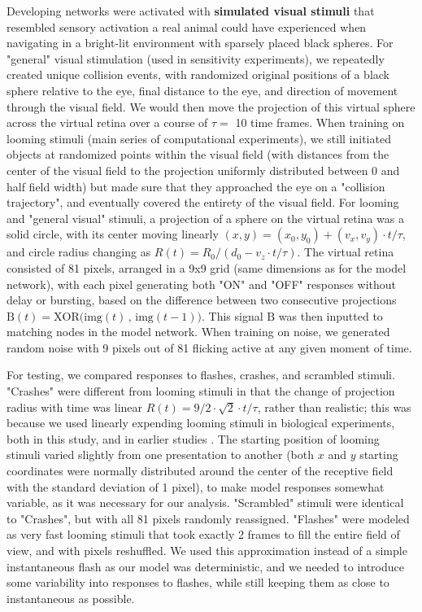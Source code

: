 \documentclass{article}
\begin{document}
Developing networks were activated with \textbf{simulated visual stimuli} that resembled sensory activation a real animal could have experienced when navigating in a bright-lit environment with sparsely placed black spheres. For "general" visual stimulation (used in sensitivity experiments), we repeatedly created unique collision events, with randomized original positions of a black sphere relative to the eye, final distance to the eye, and direction of movement through the visual field. We would then move the projection of this virtual sphere across the virtual retina over a course of $\tau=$ 10 time frames.  When training on looming stimuli (main series of computational experiments), we still initiated objects at randomized points within the visual field (with distances from the center of the visual field to the projection uniformly distributed between 0 and half field width) but made sure that they approached the eye on a "collision trajectory", and eventually covered the entirety of the visual field. For looming and "general visual" stimuli, a projection of a sphere on the virtual retina was a solid circle, with its center moving linearly $(x,y) = (x_0,y_0)+(v_x,v_y)\cdot t/\tau$, and circle radius changing as $R(t) = R_0/(d_0 - v_z \cdot t/\tau)$. The virtual retina consisted of 81 pixels, arranged in a 9x9 grid (same dimensions as for the model network), with each pixel generating both "ON" and "OFF" responses without delay or bursting, based on the difference between two consecutive projections $\mathrm{B}(t) = \mathrm{XOR}\big(\mathrm{img}(t)\, , \, \mathrm{img}(t-1)\big)$. This signal $\mathrm{B}$ was then inputted to matching nodes in the model network. When training on noise, we generated random noise with 9 pixels out of 81 flicking active at any given moment of time. 

For testing, we compared responses to flashes, crashes, and scrambled stimuli. "Crashes" were different from looming stimuli in that the change of projection radius with time was linear $R(t) = 9/2 \cdot \sqrt{2} \cdot t/\tau$, rather than realistic; this was because we used linearly expending looming stimuli in biological experiments, both in this study, and in earlier studies \citep{khakhalin2014}. The starting position of looming stimuli varied slightly from one presentation to another (both $x$ and $y$ starting coordinates were normally distributed around the center of the receptive field with the standard deviation of 1 pixel), to make model responses somewhat variable, as it was necessary for our analysis. "Scrambled" stimuli were identical to "Crashes", but with all 81 pixels randomly reassigned. "Flashes" were modeled as very fast looming stimuli that took exactly 2 frames to fill the entire field of view, and with pixels reshuffled. We used this approximation instead of a simple instantaneous flash as our model was deterministic, and we needed to introduce some variability into responses to flashes, while still keeping them as close to instantaneous as possible. 
\end{document}
